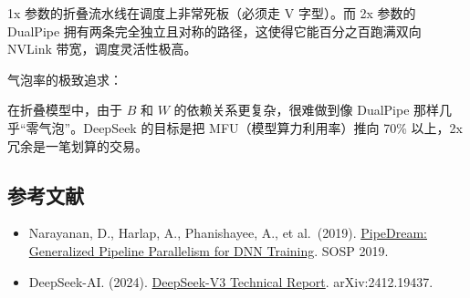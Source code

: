 1x 参数的折叠流水线在调度上非常死板（必须走 V 字型）。而 2x 参数的 DualPipe 拥有两条完全独立且对称的路径，这使得它能百分之百跑满双向 NVLink 带宽，调度灵活性极高。

气泡率的极致追求：

在折叠模型中，由于 \(B\) 和 \(W\) 的依赖关系更复杂，很难做到像 DualPipe 那样几乎``零气泡''。DeepSeek 的目标是把 MFU（模型算力利用率）推向 70\% 以上，2x 冗余是一笔划算的交易。

\FloatBarrier
{}
\hypertarget{ux53c2ux8003ux6587ux732e-37}{%
\subsection{参考文献}\label{ux53c2ux8003ux6587ux732e-37}}

\vspace{0.25em}
\begin{itemize}
\tightlist
\item
  Narayanan, D., Harlap, A., Phanishayee, A., et al.~(2019). \href{https://dl.acm.org/doi/10.1145/3341301.3359646}{PipeDream: Generalized Pipeline Parallelism for DNN Training}. SOSP 2019.
\item
  DeepSeek-AI. (2024). \href{https://arxiv.org/abs/2412.19437}{DeepSeek-V3 Technical Report}. arXiv:2412.19437.
\end{itemize}

\clearpage

